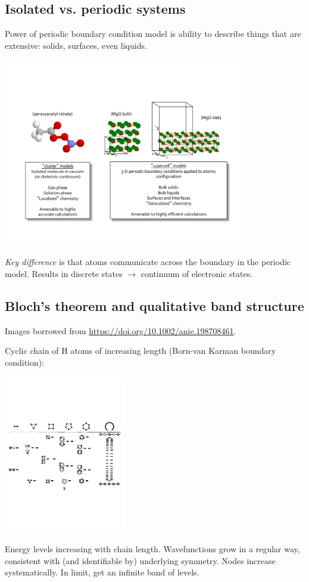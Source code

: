 \documentclass[11pt]{article}
\begin{document}
\subsection{Isolated vs. periodic systems}
\label{sec:orgd8c2969}
Power of periodic boundary condition model is ability to describe
things that are extensive: solids, surfaces, even liquids.

\begin{center}
\includegraphics[width=0.8\textwidth]{./Images/ClusterPeriodic.pdf}
\end{center}

\emph{Key difference} is that atoms communicate across the boundary in the periodic model.  Results in discrete states \(\rightarrow\) continuum of electronic states.
\subsection{Bloch's theorem and qualitative band structure}
\label{sec:org7ee905a}
Images borrowed from \url{https://doi.org/10.1002/anie.198708461}.

Cyclic chain of H atoms of increasing length (Born-van Karman boundary condition):
\begin{center}
\includegraphics[width=0.4\textwidth]{./Images/CyclicH.pdf}
\end{center}
Energy levels increasing with chain length. Wavefunctions grow in a regular way, consistent with (and identifiable by) underlying symmetry. Nodes increase systematically. In limit, get an infinite band of levels.
\end{document}
